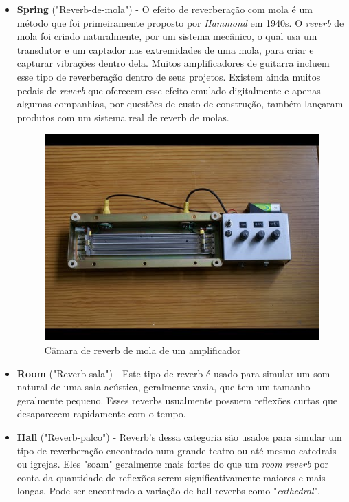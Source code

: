 		\begin{itemize}
			\item \textbf{Spring} ("Reverb-de-mola") - O efeito de reverberação com mola é um método que foi primeiramente proposto por \textit{Hammond} em 1940s. O \textit{reverb} de mola foi criado naturalmente, por um sistema mecânico, o qual usa um transdutor e um captador nas extremidades de uma mola, para criar e capturar vibrações dentro dela. Muitos amplificadores de guitarra incluem esse tipo de reverberação dentro de seus projetos. Existem ainda muitos pedais de \textit{reverb} que oferecem esse efeito emulado digitalmente e apenas algumas companhias, por questões de custo de construção, também lançaram produtos com um sistema real de reverb de molas.
			
			\begin{figure}[! h]
				\centering
				\includegraphics[scale=0.3]{./figuras/spring-reverb.jpg}
				\caption{Câmara de reverb de mola de um amplificador}
				\label{spring-reverb}
			\end{figure}
			
			\item \textbf{Room} ("Reverb-sala") - Este tipo de reverb é usado para simular um som natural de uma sala acústica, geralmente vazia, que tem um tamanho geralmente pequeno. Esses reverbs usualmente possuem reflexões curtas que desaparecem rapidamente com o tempo. 
			
			\item \textbf{Hall} ("Reverb-palco") - Reverb's dessa categoria são usados para simular um tipo de reverberação encontrado num grande teatro ou até mesmo catedrais ou igrejas. Eles "soam" geralmente mais fortes do que um \textit{room reverb} por conta da quantidade de reflexões serem significativamente maiores e mais longas. Pode ser encontrado a variação de hall reverbs como "\textit{cathedral}".
			

\end{itemize}
